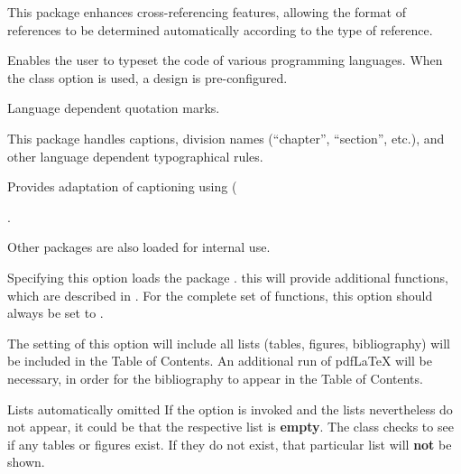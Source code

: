 \documentclass[babel=english,highlight=false]{skdoc}
\begin{document}
\begin{description}[itemsep=1pt, style=multiline, leftmargin=3cm]
                    \item[\pkg{cleveref}] This package enhances cross-referencing features, allowing the format of references to be determined automatically according to the type of reference.
                    
                    
                    \item[\pkg{listings}]
                    Enables the user to typeset the code of various programming languages. When the class option  is used, a design is pre-configured.
                    
                    
                    \item[\pkg{csquotes}] Language dependent quotation marks.
                    
                    
                    \item[\pkg{babel}] This package handles captions, division names (``chapter'', ``section'', etc.), and other language dependent typographical rules.
                    
                    \item[\pkg{caption}] Provides adaptation of captioning using (\Macro\caption).
                \end{description}

                \noindent Other packages are also loaded for internal use.\medskip

                Specifying this option loads the package . this will provide additional functions, which are described in  . For the complete set of functions, this option should always be set to .\medskip

                The setting of this option will include all lists (tables, figures, bibliography) will be included in the Table of Contents. An additional run of pdf\LaTeX{} will be necessary, in order for the  bibliography to appear in the Table of Contents.

                \begin{info}{Lists automatically omitted}
                    If the option  is invoked and the lists nevertheless do not appear, it could be that the respective list is \textbf{empty}. The class checks to see if any tables or figures exist. If they do not exist, that particular list will \textbf{not} be shown.
                \end{info}
\end{document}
